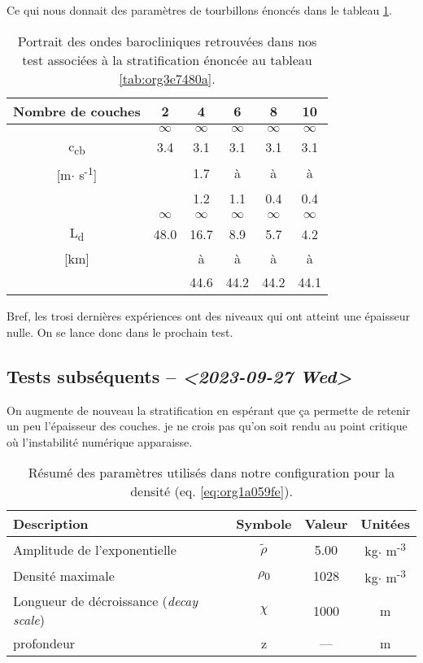 \documentclass[10pt]{article}
\numberwithin{equation}{section}
\begin{document}
Ce qui nous donnait des paramètres de tourbillons énoncés dans le tableau \ref{tab:org39436f6}. 

\begin{table}[htbp]
\caption{\label{tab:org39436f6}Portrait des ondes barocliniques retrouvées dans nos test  associées à la stratification énoncée au tableau \ref{tab:org3e7480a}.}
\centering
\begin{tabular}{cccccc}
\hline
\hline
Nombre de couches & 2 & 4 & 6 & 8 & 10\\
\hline
 & \(\infty\) & \(\infty\) & \(\infty\) & \(\infty\) & \(\infty\)\\
c\textsubscript{cb} & 3.4 & 3.1 & 3.1 & 3.1 & 3.1\\
{[}m\(\cdot\) s\textsuperscript{-1}] &  & 1.7 & à & à & à\\
 &  & 1.2 & 1.1 & 0.4 & 0.4\\
\hline
 & \(\infty\) & \(\infty\) & \(\infty\) & \(\infty\) & \(\infty\)\\
L\textsubscript{d} & 48.0 & 16.7 & 8.9 & 5.7 & 4.2\\
{[}km] &  & à & à & à & à\\
 &  & 44.6 & 44.2 & 44.2 & 44.1\\
\hline
\end{tabular}
\end{table}

Bref, les trosi dernières expériences ont des niveaux qui ont atteint une épaisseur nulle.
On se lance donc dans le prochain test.
\subsection{Tests subséquents -- \textit{<2023-09-27 Wed>}}
\label{sec:org29d203d}

On augmente de nouveau la stratification en espérant que ça permette de retenir un peu l'épaisseur des couches.
je ne crois pas qu'on soit rendu au point critique où l'instabilité numérique apparaisse. 
\begin{table}[htbp]
\caption{\label{tab:org05a85ea}Résumé des paramètres utilisés dans notre configuration pour la densité (eq. \ref{eq:org1a059fe}).}
\centering
\begin{tabular}{lccc}
\hline
\hline
Description & Symbole & Valeur & Unitées\\
\hline
Amplitude de l'exponentielle & \(\tilde{\rho}\) & 5.00 & kg\(\cdot\) m\textsuperscript{-3}\\
Densité maximale & \(\rho\)\textsubscript{0} & 1028 & kg\(\cdot\) m\textsuperscript{-3}\\
Longueur de décroissance (\emph{decay scale}) & \(\chi\) & 1000 & m\\
profondeur & z & --- & m\\
\hline
\end{tabular}
\end{table}
\end{document}
